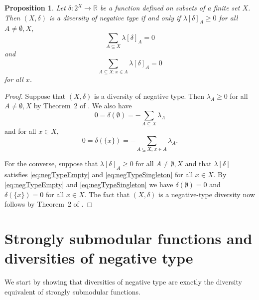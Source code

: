\documentclass{article}
\theoremstyle{plain}
\newtheorem{proposition}[theorem]{Proposition}
\theoremstyle{definition}
\renewcommand{\Re}{\mathbb{R}}
\begin{document}
\begin{proposition} \label{prop:charNegBonus}
Let $\delta:2^X \rightarrow \Re$ be a function defined on subsets of a finite set $X$. Then $(X,\delta)$ is a diversity of negative type if and only if
$\lambda[\delta]_A \geq 0$ for all $A \neq \emptyset, X$,
\begin{equation} \label{eq:negTypeEmpty}
    \sum_{A \subseteq X} \lambda[\delta]_A = 0
\end{equation}
and
\begin{equation} \label{eq:negTypeSingleton}
\sum_{A \subseteq X:x \in A} \lambda[\delta]_A = 0
\end{equation}
for all $x$. 
\end{proposition}
\begin{proof}
Suppose that $(X,\delta)$ is a diversity of negative type. Then $\lambda_A \geq 0$ for all $A \neq \emptyset,X$ by Theorem~2 of \cite{WuBryantEtal19}. We also have
\[0 = \delta(\emptyset) = -\sum_{A \subseteq X} \lambda_A\]
and for all $x \in X$,
\[0 = \delta(\{x\}) = -\sum_{A \subseteq X,\, x \in A} \lambda_A.\]

For the converse, suppose that $\lambda[\delta]_A \geq 0$ for all $A \neq \emptyset,X$ and that $\lambda[\delta]$ satisfies \eqref{eq:negTypeEmpty} and \eqref{eq:negTypeSingleton} for all $x \in X$. By \eqref{eq:negTypeEmpty} and \eqref{eq:negTypeSingleton} we have $\delta(\emptyset) = 0$ and $\delta(\{x\}) = 0$ for all $x \in X$. The fact that $(X,\delta)$ is a negative-type diversity now follows by Theorem~2 of \cite{WuBryantEtal19}.
\end{proof}









\section{Strongly submodular functions and diversities of negative type}

We start by showing that diversities of negative type are exactly the diversity equivalent of strongly submodular functions. 
\end{document}
